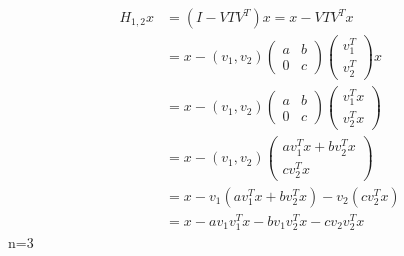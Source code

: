 \begin{align*}
  H_{1,2} x &= (I - V T V^T) x = x - V T V^T x\\
  &= x - (v_1, v_2)
  \begin{pmatrix}
    a & b \\ 0 & c
  \end{pmatrix}
  \begin{pmatrix}
    v_1^T \\ v_2^T 
  \end{pmatrix}
  x\\
  &= x - (v_1, v_2)
  \begin{pmatrix}
    a & b \\ 0 & c
  \end{pmatrix}
  \begin{pmatrix}
    v_1^T x \\ v_2^T x
  \end{pmatrix}\\
  &= x - (v_1, v_2)
  \begin{pmatrix}
    a v_1^T x + b v_2^T x\\  c v_2^T x
  \end{pmatrix}\\
  &= x - v_1(a v_1^T x + b v_2^T x) - v_2 (c v_2^T x)\\
  &= x - a v_1 v_1^T x - b v_1 v_2^T x - c v_2 v_2^T x
\end{align*}
n=3

